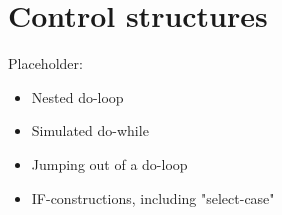 \section{Control structures}
Placeholder:
\begin{itemize}
\item
Nested do-loop
\item
Simulated do-while
\item
Jumping out of a do-loop
\item
IF-constructions, including "select-case"
\end{itemize}
